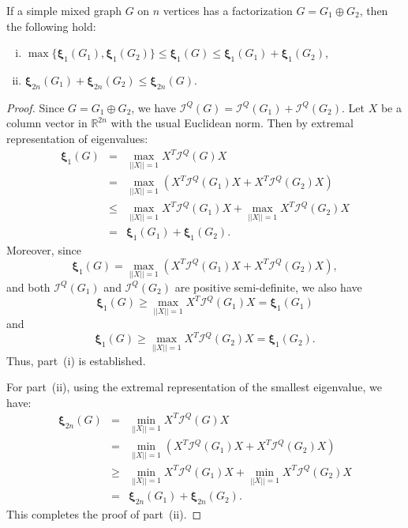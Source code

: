 \documentclass[10pt,a4paper]{amsart}
\begin{document}
	\begin{thm}\label{thm-factorization ineqq}
		If a simple mixed graph $G$ on $n$ vertices has a  factorization $G=G_1\oplus G_2$, then the following hold:
		\begin{enumerate}[(i)]
			\item $\max\{\bm{\xi}_{1}(G_1),\bm{\xi}_{1}(G_2)\}\leq\bm{\xi}_{1}(G)\leq\bm{\xi}_{1}(G_1)+\bm{\xi}_{1}(G_2)$,
			\item $\bm{\xi}_{2n}(G_1)+\bm{\xi}_{2n}(G_2)\leq \bm{\xi}_{2n}(G)$.
		\end{enumerate}
	\end{thm}

	\begin{proof}
		Since $G=G_1\oplus G_2$, we have $\mathcal{I}^Q(G)=\mathcal{I}^Q(G_1)+\mathcal{I}^Q(G_2)$. Let $X$ be a column vector in $\mathbb{R}^{2n}$ with the usual Euclidean norm. Then by extremal representation of eigenvalues:
		\begin{eqnarray*}
			\bm{\xi}_1(G)&=&\underset{||X||=1}{\max}X^T\mathcal{I}^Q(G)X\\
			&=&\underset{||X||=1}{\max}(X^T\mathcal{I}^Q(G_1)X+X^T\mathcal{I}^Q(G_2)X)\\
			&\leq&\underset{||X||=1}{\max}X^T\mathcal{I}^Q(G_1)X+\underset{||X||=1}{\max}X^T\mathcal{I}^Q(G_2)X\\
			&=&\bm{\xi}_1(G_1)+\bm{\xi}_1(G_2).
		\end{eqnarray*}
		Moreover, since
	\begin{equation*}
		\bm{\xi}_1(G)=\underset{||X||=1}{\max}(X^T\mathcal{I}^Q(G_1)X+X^T\mathcal{I}^Q(G_2)X), 		
	\end{equation*}		
		and both $\mathcal{I}^Q(G_1)$ and $\mathcal{I}^Q(G_2)$ are positive semi-definite,
		we also have 
		\begin{equation*}
			\bm{\xi}_1(G)\geq\underset{||X||=1}{\max}X^T\mathcal{I}^Q(G_1)X=\bm{\xi}_1(G_1)
		\end{equation*}		
			 and 	
		\begin{equation*}
			 		\bm{\xi}_1(G)\geq\underset{||X||=1}{\max}X^T\mathcal{I}^Q(G_2)X=\bm{\xi}_1(G_2).
		\end{equation*}	
	Thus, part~(i) is established.
		
		For part~(ii), using the extremal representation of the smallest eigenvalue, we have:
		\begin{eqnarray*}
			\bm{\xi}_{2n}(G)&=&\underset{||X||=1}{\min}X^T\mathcal{I}^Q(G)X\\
			&=&\underset{||X||=1}{\min}(X^T\mathcal{I}^Q(G_1)X+X^T\mathcal{I}^Q(G_2)X)\\
			&\geq&\underset{||X||=1}{\min}X^T\mathcal{I}^Q(G_1)X+\underset{||X||=1}{\min}X^T\mathcal{I}^Q(G_2)X\\
			&=&\bm{\xi}_{2n}(G_1)+\bm{\xi}_{2n}(G_2).
		\end{eqnarray*}
		This completes the proof of part~(ii).
	\end{proof}
\end{document}
